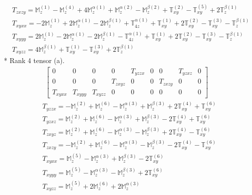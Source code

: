 \documentclass[fleqn,8pt,landscape]{jsarticle}
\begin{document}
\begin{align*}
& T_{zxzy} = \mathbb{M}_{z}^{(1)} - \mathbb{M}_{z}^{(4)} + 4 \mathbb{M}_{z}^{\alpha(1)} + \mathbb{M}_{z}^{\alpha(2)} - \mathbb{M}_{z}^{\beta(2)} + \mathbb{T}_{xy}^{(2)} - \mathbb{T}_{xy}^{(5)} + 2 \mathbb{T}_{z}^{\beta(1)} \\
& T_{xyxx} = - 2 \mathbb{M}_{z}^{(1)} + 2 \mathbb{M}_{z}^{\alpha(1)} - 2 \mathbb{M}_{z}^{\beta(1)} + \mathbb{T}_{4z}^{\alpha(1)} + \mathbb{T}_{xy}^{(1)} + 2 \mathbb{T}_{xy}^{(2)} - \mathbb{T}_{xy}^{(3)} - \mathbb{T}_{z}^{\beta(1)} \\
& T_{xyyy} = 2 \mathbb{M}_{z}^{(1)} - 2 \mathbb{M}_{z}^{\alpha(1)} - 2 \mathbb{M}_{z}^{\beta(1)} - \mathbb{T}_{4z}^{\alpha(1)} + \mathbb{T}_{xy}^{(1)} + 2 \mathbb{T}_{xy}^{(2)} - \mathbb{T}_{xy}^{(3)} - \mathbb{T}_{z}^{\beta(1)} \\
& T_{xyzz} = 4 \mathbb{M}_{z}^{\beta(1)} + \mathbb{T}_{xy}^{(1)} - \mathbb{T}_{xy}^{(3)} + 2 \mathbb{T}_{z}^{\beta(1)}
\end{align*}
* Rank 4 tensor (a).
\begin{align*}
\begin{bmatrix} 0 & 0 & 0 & 0 & T_{yzzx} & 0 & 0 & T_{yzxz} & 0 \\ 0 & 0 & 0 & T_{zxyz} & 0 & 0 & T_{zxzy} & 0 & 0 \\ T_{xyxx} & T_{xyyy} & T_{xyzz} & 0 & 0 & 0 & 0 & 0 & 0 \end{bmatrix}
\end{align*}
\begin{align*}
& T_{yzzx} = - \mathbb{M}_{z}^{(2)} + \mathbb{M}_{z}^{(6)} - \mathbb{M}_{z}^{\alpha(3)} + \mathbb{M}_{z}^{\beta(3)} + 2 \mathbb{T}_{xy}^{(4)} + \mathbb{T}_{xy}^{(6)} \\
& T_{yzxz} = \mathbb{M}_{z}^{(2)} + \mathbb{M}_{z}^{(6)} - \mathbb{M}_{z}^{\alpha(3)} + \mathbb{M}_{z}^{\beta(3)} - 2 \mathbb{T}_{xy}^{(4)} + \mathbb{T}_{xy}^{(6)} \\
& T_{zxyz} = \mathbb{M}_{z}^{(2)} + \mathbb{M}_{z}^{(6)} - \mathbb{M}_{z}^{\alpha(3)} - \mathbb{M}_{z}^{\beta(3)} + 2 \mathbb{T}_{xy}^{(4)} - \mathbb{T}_{xy}^{(6)} \\
& T_{zxzy} = - \mathbb{M}_{z}^{(2)} + \mathbb{M}_{z}^{(6)} - \mathbb{M}_{z}^{\alpha(3)} - \mathbb{M}_{z}^{\beta(3)} - 2 \mathbb{T}_{xy}^{(4)} - \mathbb{T}_{xy}^{(6)} \\
& T_{xyxx} = \mathbb{M}_{z}^{(5)} - \mathbb{M}_{z}^{\alpha(3)} + \mathbb{M}_{z}^{\beta(3)} - 2 \mathbb{T}_{xy}^{(6)} \\
& T_{xyyy} = \mathbb{M}_{z}^{(5)} - \mathbb{M}_{z}^{\alpha(3)} - \mathbb{M}_{z}^{\beta(3)} + 2 \mathbb{T}_{xy}^{(6)} \\
& T_{xyzz} = \mathbb{M}_{z}^{(5)} + 2 \mathbb{M}_{z}^{(6)} + 2 \mathbb{M}_{z}^{\alpha(3)}
\end{align*}
\end{document}
